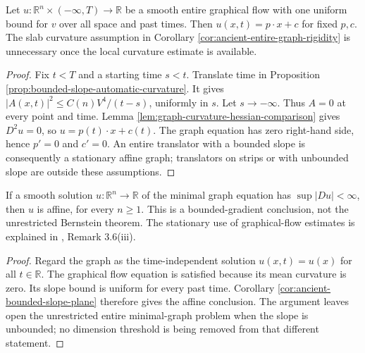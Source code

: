 \begin{corollary}\label{cor:ancient-bounded-slope-plane}
Let $u:\mathbb R^n\times(-\infty,T)\to\mathbb R$ be a smooth entire graphical flow with one uniform bound for $v$ over all space and past times. Then $u(x,t)=p\cdot x+c$ for fixed $p,c$. The slab curvature assumption in Corollary \ref{cor:ancient-entire-graph-rigidity} is unnecessary once the local curvature estimate is available.
\end{corollary}
\begin{proof}
Fix $t<T$ and a starting time $s<t$. Translate time in Proposition \ref{prop:bounded-slope-automatic-curvature}. It gives $|A(x,t)|^2\leq C(n)V^4/(t-s)$, uniformly in $s$. Let $s\to-\infty$. Thus $A=0$ at every point and time. Lemma \ref{lem:graph-curvature-hessian-comparison} gives $D^2u=0$, so $u=p(t)\cdot x+c(t)$. The graph equation has zero right-hand side, hence $p'=0$ and $c'=0$. An entire translator with a bounded slope is consequently a stationary affine graph; translators on strips or with unbounded slope are outside these assumptions.
\end{proof}

\begin{corollary}\label{cor:bounded-gradient-minimal-graph-affine}
If a smooth solution $u:\mathbb R^n\to\mathbb R$ of the minimal graph equation has $\sup|Du|<\infty$, then $u$ is affine, for every $n\geq1$. This is a bounded-gradient conclusion, not the unrestricted Bernstein theorem. The stationary use of graphical-flow estimates is explained in \cite{EH91}, Remark 3.6(iii).
\end{corollary}
\begin{proof}
Regard the graph as the time-independent solution $u(x,t)=u(x)$ for all $t\in\mathbb R$. The graphical flow equation is satisfied because its mean curvature is zero. Its slope bound is uniform for every past time. Corollary \ref{cor:ancient-bounded-slope-plane} therefore gives the affine conclusion. The argument leaves open the unrestricted entire minimal-graph problem when the slope is unbounded; no dimension threshold is being removed from that different statement.
\end{proof}

